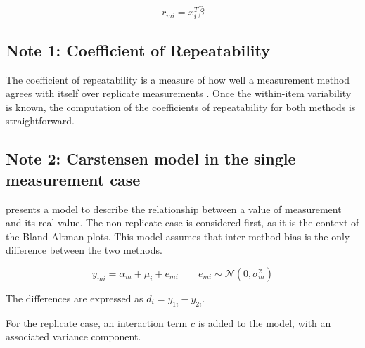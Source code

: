 \documentclass[12pt, a4paper]{report}
\theoremstyle{plain}
\theoremstyle{definition}
\theoremstyle{remark}
\begin{document}
\begin{equation}
r_{mi}=x^{T}_{i}\hat{\beta}
\end{equation}


\subsection{Note 1: Coefficient of Repeatability}
The coefficient of repeatability is a measure of how well a
measurement method agrees with itself over replicate measurements
\citep{BA99}. Once the within-item variability is known, the
computation of the coefficients of repeatability for both methods
is straightforward.



\subsection{Note 2: Carstensen model in the single measurement case}
\citet{BXC2004} presents a model to describe the relationship between a value of measurement and its real value.
The non-replicate case is considered first, as it is the context of the Bland-Altman plots.
This model assumes that inter-method bias is the only difference between the two methods.


\begin{equation}
y_{mi}  = \alpha_{m} + \mu_{i} + e_{mi} \qquad  e_{mi} \sim \mathcal{N}(0,\sigma^{2}_{m})
\end{equation}

The differences are expressed as $d_{i} = y_{1i} - y_{2i}$.

For the replicate case, an interaction term $c$ is added to the model, with an associated variance component.
\end{document}
